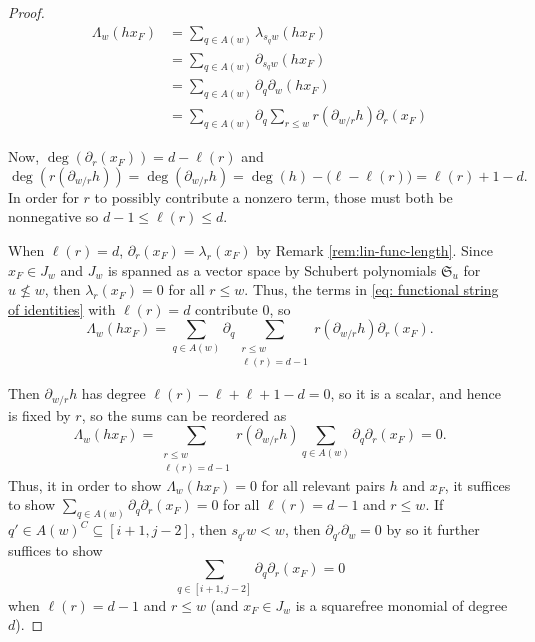 \begin{proof}
    \begin{align}
    \label{eq: functional string of identities}
    \Lambda_w(hx_F)
    & = \sum_{q\in A(w)}\!\!\lambda_{s_qw}(hx_F) \\
    & = \sum_{q\in A(w)}\!\!\partial_{s_qw}(hx_F) \\
    & = \sum_{q\in A(w)}\!\!\partial_q\partial_w(hx_F) \\ 
    & = \sum_{q\in A(w)}\!\!\partial_q\sum_{r\leq w}r\!\left(\partial_{w/r}h\right)\partial_r(x_F)    
    \end{align}
    
    Now, $\deg\!\left(\partial_r(x_F)\right) = d-\ell(r)$ and \[ \deg\!\left(r(\partial_{w/r}h)\right) = \deg\!\left(\partial_{w/r}h\right) = \deg(h)-\bigl(\ell-\ell(r)\bigr) = \ell(r)+1-d.\] 
    In order for $r$ to possibly contribute a nonzero term, those must both be nonnegative so $d-1\leq \ell(r) \leq d$.

    When $\ell(r) =d$, $\partial_r(x_F) = \lambda_r(x_F)$ by Remark \ref{rem:lin-func-length}. 
    Since $x_F\in J_w$ and $J_w$ is spanned as a vector space by Schubert polynomials $\mathfrak{S}_{u}$ for $u\not\leq w$, then $\lambda_r(x_F) = 0$ for all $r\leq w$. 
    Thus, the terms in \eqref{eq: functional string of identities} with $\ell(r) =d$ contribute $0$, so \[\Lambda_w(hx_F) = \sum_{q\in A(w)}\!\!\partial_q\!\sum_{\substack{r\leq w\\\ell(r)=d-1}}\!\!\!r\left(\partial_{w/r}h\right)\partial_r(x_F).\]
    
    Then $\partial_{w/r}h$ has degree $\ell(r)-\ell+\ell+1-d = 0$, so it is a scalar, and hence is fixed by $r$, so the sums can be reordered as 
    \[
    \Lambda_w(hx_F) = \sum_{\substack{r\leq w\\\ell(r)=d-1}}\!\!\!r\left(\partial_{w/r}h\right)\sum_{q\in A(w)}\!\!\partial_q\partial_r(x_F)=0.
    \]
    Thus, it in order to show $\Lambda_{w}(hx_F) = 0$ for all relevant pairs $h$ and $x_F$, it  suffices to show $\sum_{q\in A(w)}\partial_q\partial_r(x_F)=0$ for all $\ell(r) = d-1$ and $r\leq w$. 
    If \(q'\in A(w)^C \subseteq [i+1,j-2]\), then \(s_{q'}w<w\), then \(\partial_{q'}\partial_w=0\) by \cite[Equation 2.7]{Macdonald} so it further suffices to show \[\displaystyle\sum_{q\in [i+1,j-2]}\partial_q\partial_r(x_F)=0\] when $\ell(r) = d-1$ and $r\leq w$ (and $x_F\in J_w$ is a squarefree monomial of degree $d$). 
    

\end{proof}
